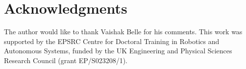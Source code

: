 \documentclass[runningheads]{llncs}
\begin{document}
\section*{Acknowledgments}

The author would like to thank Vaishak Belle for his comments. This work was
supported by the EPSRC Centre for Doctoral Training in Robotics and Autonomous
Systems, funded by the UK Engineering and Physical Sciences Research Council
(grant EP/S023208/1).



\end{document}
